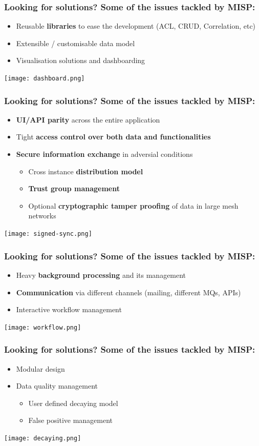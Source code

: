 \begin{frame}
\frametitle{Looking for solutions? Some of the issues tackled by MISP:}
    \begin{itemize}
        \item Reusable {\bf libraries} to ease the development (ACL, CRUD, Correlation, etc)
        \item Extensible / customisable data model
        \item Visualisation solutions and dashboarding
    \end{itemize}
    \texttt{[image: dashboard.png]}
\end{frame}


\begin{frame}
\frametitle{Looking for solutions? Some of the issues tackled by MISP:}
    \begin{itemize}
        \item {\bf UI/API parity} across the entire application
        \item Tight {\bf access control over both data and functionalities}
        \item {\bf Secure information exchange} in adversial conditions
        \begin{itemize}
            \item Cross instance {\bf distribution model}
            \item {\bf Trust group management}
            \item Optional {\bf cryptographic tamper proofing} of data in large mesh networks
        \end{itemize}
    \end{itemize}
    \texttt{[image: signed-sync.png]}
\end{frame}

\begin{frame}
\frametitle{Looking for solutions? Some of the issues tackled by MISP:}
    \begin{itemize}
        \item Heavy {\bf background processing} and its management
        \item {\bf Communication} via different channels (mailing, different MQs, APIs)
        \item Interactive workflow management
    \end{itemize}
    \texttt{[image: workflow.png]}
\end{frame}

\begin{frame}
\frametitle{Looking for solutions? Some of the issues tackled by MISP:}
    \begin{itemize}
        \item Modular design
        \item Data quality management
        \begin{itemize}
            \item User defined decaying model
            \item False positive management
        \end{itemize}
    \end{itemize}
    \texttt{[image: decaying.png]}
\end{frame}

